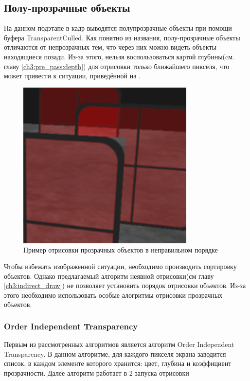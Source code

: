 	\subsection{Полу-прозрачные объекты} \label{ch3:render_pass:transparents}
		На данном подэтапе в кадр выводятся полупрозрачные объекты при помощи буфера TransparentCulled. Как понятно из названия, полу-прозрачные объекты отличаются от непрозрачных тем, что через них можно видеть объекты находящиеся позади. Из-за этого, нельзя воспользоваться картой глубины(cм. главу \ref{ch3:pre_pass:depth}) для отрисовки только ближайшего пикселя, что может привести к ситуации, приведённой на .
		
		\begin{figure}[ht!] 
			\center
			\includegraphics [scale=0.5] {my_folder/images//incorrect_transparent}	
			\caption{Пример отрисовки прозрачных объектов в неправильном порядке} 
			\label{fig:incorrect_transparent}
		\end{figure}
		
		Чтобы избежать изображенной ситуации, необходимо производить сортировку объектов. Однако предлагаемый алгоритм неявной отрисовки(см главу \ref{ch3:indirect_draw}) не позволяет установить порядок отрисовки объектов. Из-за этого необходимо использовать особые алогритмы отрисовки прозрачных объектов.		
		
		\subsubsection{Order Independent Transparency} \label{ch3:render_pass:transparents:oit}
			Первым из рассмотренных алгоритмов является алгоритм Order Independent Transparency. В данном алгоритме, для каждого пикселя экрана заводится список, в каждом элементе которого хранится: цвет, глубина и коэффициент прозрачности. Далее алгоритм работает в 2 запуска отрисовки
			
